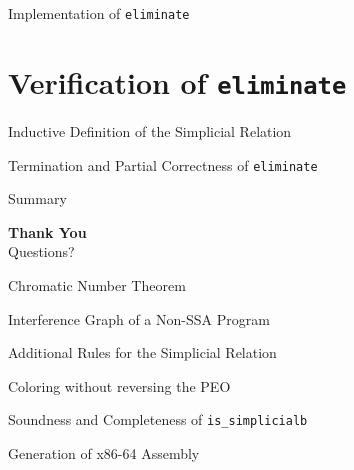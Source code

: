 \documentclass[aspectratio=169,xcolor=dvipsnames]{beamer}
\begin{document}
\begin{frame}{Implementation of \texttt{eliminate}}

\end{frame}

\section{Verification of \texttt{eliminate}}

\begin{frame}{Inductive Definition of the Simplicial Relation}

\end{frame}

\begin{frame}{Termination and Partial Correctness of \texttt{eliminate}}

\end{frame}

\begin{frame}{Summary}

\end{frame}

\begin{frame}
    \centering
    {\Huge \textbf{Thank You}} \\[1.5em]
    {\LARGE Questions?}
\end{frame}

\appendix
\backupbegin

\begin{frame}{Chromatic Number Theorem}

\end{frame}

\begin{frame}{Interference Graph of a Non-SSA Program}

\end{frame}

\begin{frame}{Additional Rules for the Simplicial Relation}

\end{frame}

\begin{frame}{Coloring without reversing the PEO}

\end{frame}

\begin{frame}{Soundness and Completeness of \texttt{is\_simplicialb}}

\end{frame}

\begin{frame}{Generation of x86-64 Assembly}

\end{frame}
\backupend
\end{document}
